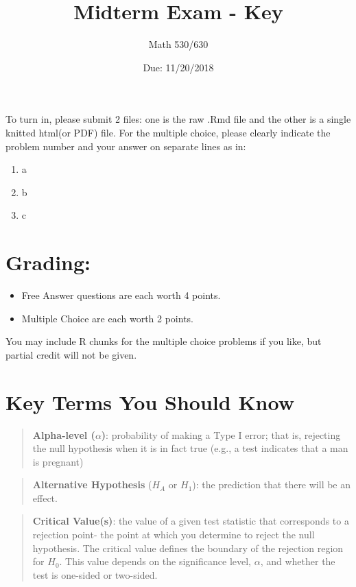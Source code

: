 \documentclass[]{article}
\title{Midterm Exam - Key}
\subtitle{Math 530/630}
\author{}
\date{Due: 11/20/2018}
\providecommand{\tightlist}{%
  \setlength{\itemsep}{0pt}\setlength{\parskip}{0pt}}
\begin{document}
\maketitle

To turn in, please submit 2 files: one is the raw .Rmd file and the
other is a single knitted html(or PDF) file. For the multiple choice,
please clearly indicate the problem number and your answer on separate
lines as in:

\begin{enumerate}
\def\labelenumi{\arabic{enumi}.}
\tightlist
\item
  a
\item
  b
\item
  c
\end{enumerate}

\section{Grading:}\label{grading}

\begin{itemize}
\tightlist
\item
  Free Answer questions are each worth 4 points.
\item
  Multiple Choice are each worth 2 points.
\end{itemize}

You may include R chunks for the multiple choice problems if you like,
but partial credit will not be given.

\section{Key Terms You Should Know}\label{key-terms-you-should-know}

\begin{quote}
\textbf{Alpha-level (\(\alpha\))}: probability of making a Type I error;
that is, rejecting the null hypothesis when it is in fact true (e.g., a
test indicates that a man is pregnant)
\end{quote}

\begin{quote}
\textbf{Alternative Hypothesis} (\(H_A\) or \(H_1\)): the prediction
that there will be an effect.
\end{quote}

\begin{quote}
\textbf{Critical Value(s)}: the value of a given test statistic that
corresponds to a rejection point- the point at which you determine to
reject the null hypothesis. The critical value defines the boundary of
the rejection region for \(H_0\). This value depends on the significance
level, \(\alpha\), and whether the test is one-sided or two-sided.
\end{quote}
\end{document}
